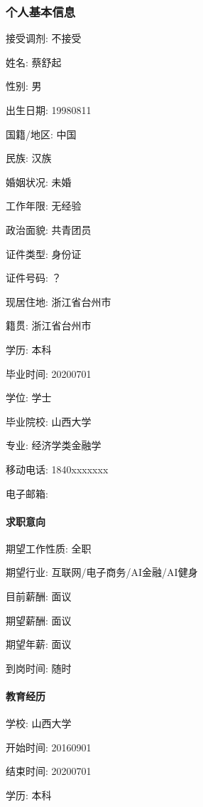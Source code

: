 \documentclass[letterpaper,11pt,english]{sphinxmanual}
\begin{document}
\subsubsection{个人基本信息}
\label{\detokenize{get_started:id10}}
接受调剂: 不接受

姓名: 蔡舒起

性别: 男

出生日期: 1998\sphinxhyphen{}08\sphinxhyphen{}11

国籍/地区: 中国

民族: 汉族

婚姻状况: 未婚

工作年限: 无经验

政治面貌: 共青团员

证件类型: 身份证

证件号码: ？

现居住地: 浙江省\sphinxhyphen{}台州市

籍贯: 浙江省\sphinxhyphen{}台州市

学历: 本科

毕业时间: 2020\sphinxhyphen{}07\sphinxhyphen{}01

学位: 学士

毕业院校: 山西大学

专业: 经济学类\sphinxhyphen{}金融学

移动电话: 1840xxxxxxx

电子邮箱: 


\paragraph{求职意向}
\label{\detokenize{get_started:id11}}
期望工作性质: 全职

期望行业: 互联网/电子商务/AI金融/AI健身

目前薪酬: 面议

期望薪酬: 面议

期望年薪: 面议

到岗时间: 随时


\paragraph{教育经历}
\label{\detokenize{get_started:id12}}
学校: 山西大学

开始时间: 2016\sphinxhyphen{}09\sphinxhyphen{}01

结束时间: 2020\sphinxhyphen{}07\sphinxhyphen{}01

学历: 本科
\end{document}
